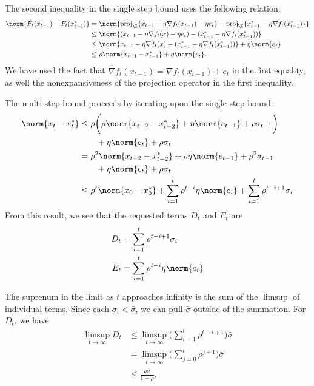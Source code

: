 \documentclass{homework}
\begin{document}
\begin{letterenum}
    The second inequality in the single step bound uses the following relation:
    \begin{align*}
        \norm{\hat{F}_t(x_{t-1}) - F_t(x_{t-1}^*)} &=
            \norm{\text{proj}_\X \{x_{t-1} - \eta \nabla f_t(x_{t-1}) - \eta e_t\} -
                \text{proj}_\X \{x_{t-1}^* - \eta \nabla f_t(x_{t-1}^*)\}} \\
            &\leq \norm{(x_{t-1} - \eta \nabla f_t(x) - \eta e_t) -
                (x_{t-1}^* - \eta \nabla f_t(x_{t-1}^*))} \\
            &\leq \norm{x_{t-1} - \eta \nabla f_t(x) - (x_{t-1}^* -
                \eta \nabla f_t(x_{t-1}^*))} + \eta \norm{e_t} \\
            &\leq \rho \norm{x_{t-1} - x_{t-1}^*} + \eta \norm{e_t}.
    \end{align*} 
    We have used the fact that
    $\hat{\nabla} f_t(x_{t-1}) = \nabla f_t(x_{t-1}) + e_t$ in the first
    equality, as well the nonexpansiveness of the
    projection operator in the first inequality.

    The multi-step bound proceeds by iterating upon the single-step bound:
    \begin{align*}
        \norm{x_t - x_t^*} &\leq \rho \biggl(
            \rho \norm{x_{t-2} - x_{t-2}^*} + \eta \norm{e_{t-1}} +
                \rho \sigma_{t-1}
        \biggr) \\
            &\qquad + \eta \norm{e_t} + \rho \sigma_t \\
        &= \rho^2 \norm{x_{t-2} - x_{t-2}^*} + \rho \eta \norm{e_{t-1}}
            + \rho^2 \sigma_{t-1} \\
            &\qquad + \eta \norm{e_t} + \rho \sigma_t \\
        &\leq \rho^t \norm{x_0 - x_0^*} + \sum_{i=1}^{t} \rho^{t-i} \eta \norm{e_i}
            + \sum_{i=1}^{t} \rho^{t-i+1} \sigma_i
    \end{align*}
    From this result, we see that the requested terms $D_t$ and $E_t$ are
    \begin{align*}
        D_t &= \sum_{i=1}^t \rho^{t-i+1} \sigma_i \\
        E_t &= \sum_{i=1}^t \rho^{t-i} \eta \norm{e_i} \\
    \end{align*}

    \item The suprenum in the limit as $t$ approaches infinity is the sum
    of the $\limsup$ of individual terms. Since each $\sigma_i < \bar{\sigma}$,
    we can pull $\bar{\sigma}$ outside of the summation.
    For $D_t$, we have
    \begin{align*}
        \limsup_{t\to\infty} D_t &\leq \limsup_{t\to\infty} \biggl(
            \sum_{i=1}^t \rho^{t-i+1} 
        \biggr) \bar{\sigma} \\
        &= \limsup_{t\to\infty} \biggl(
            \sum_{j=0}^t \rho^{j+1} 
        \biggr) \bar{\sigma} \\
        &\leq \frac{\rho \bar{\sigma}}{1 - \rho}.
    \end{align*}


\end{letterenum}
\end{document}

